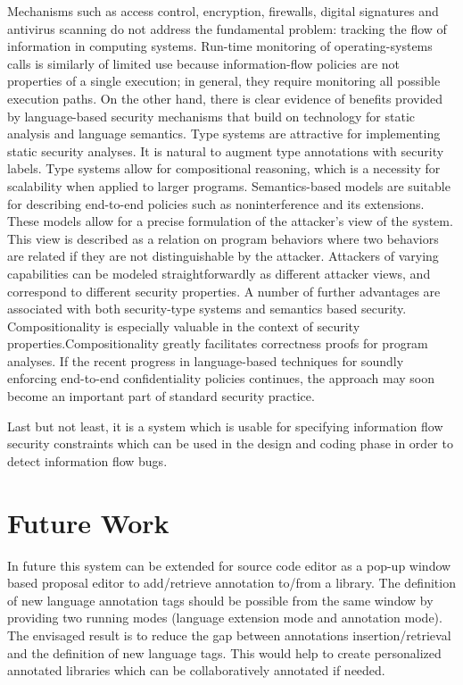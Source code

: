 Mechanisms such as access control, encryption, firewalls, digital
signatures and antivirus scanning do not address the fundamental
problem: tracking the flow of information in computing
systems. Run-time monitoring of operating-systems calls is
similarly of limited use because information-flow policies are
not properties of a single execution; in general, they require
monitoring all possible execution paths. On the other hand,
there is clear evidence of benefits provided by language-based
security mechanisms that build on technology for static analysis
and language semantics. Type systems are attractive for
implementing static security analyses. It is natural to augment
type annotations with security labels. Type systems allow for
compositional reasoning, which is a necessity for scalability
when applied to larger programs. Semantics-based models
are suitable for describing end-to-end policies such as
noninterference and its extensions. These models allow for a
precise formulation of the attacker's view of the system. This
view is described as a relation on program behaviors where
two behaviors are related if they are not distinguishable by
the attacker. Attackers of varying capabilities can be modeled
straightforwardly as different attacker views, and correspond
to different security properties. A number of further advantages are
associated with both security-type systems and semantics based
security. Compositionality is especially valuable in the
context of security properties.Compositionality
greatly facilitates correctness proofs for program analyses. If the recent
progress in language-based techniques for soundly enforcing
end-to-end confidentiality policies continues, the approach
may soon become an important part of standard security
practice.

Last but not least, it is a system which is usable for specifying information flow security constraints which can be used in the design and coding phase in order to detect information flow bugs.

\section{ Future Work}
In future this system can be extended for source code editor as
a pop-up window based proposal editor to add/retrieve
annotation to/from a library. The definition of new language
annotation tags should be possible from the same window by
providing two running modes (language extension mode and
annotation mode). The envisaged result is to reduce the gap
between annotations insertion/retrieval and the definition of
new language tags. This would help to create personalized
annotated libraries which can be collaboratively annotated if
needed.

